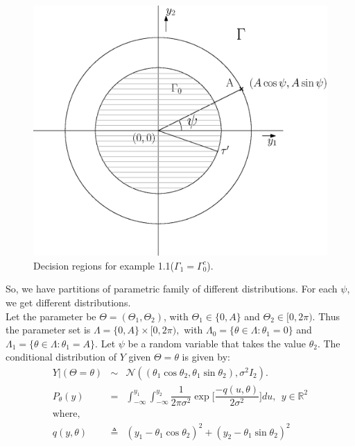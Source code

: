 \documentclass[a4paper,english,12pt]{article}
\begin{document}
\begin{exmp}
\begin{figure}
\centering
\includegraphics[scale=0.4]{Figures/decisionRegions.eps}
\caption{Decision regions for example 1.1($\Gamma_1 = \Gamma_0^c$).}
\label{fig: example 1.1}
\end{figure}
	
So, we have partitions of parametric family of different distributions.
For each $\psi$, we get different distributions.\\
Let the parameter be $\Theta = (\Theta_1,\Theta_2)$, with $\Theta_1 \in \{0,A\}$ and $\Theta_2 \in [0,2\pi)$. Thus the parameter set is $\Lambda = \{0,A\}\times [0,2\pi),$ with $\Lambda_0 = \{\theta \in \Lambda : \theta_1 = 0\}$ and $\Lambda_1 = \{\theta \in \Lambda : \theta_1 = A\}$. Let $\psi$ be a random variable that takes the value $\theta_2$. The conditional distribution of $Y$ given $\Theta = \theta$ is given by:\\
	
\begin{eqnarray}
Y|(\Theta=\theta) &\sim& \mathcal{N} ((\theta_1\cos\theta_2,\theta_1\sin\theta_2), \sigma^2I_2).\\
P_\theta(y) &=& \int_{-\infty}^{y_1}\int_{-\infty}^{y_2}\dfrac{1}{2\pi\sigma^2}\exp\Big[\dfrac{-q(u,\theta)}{2\sigma^2}\Big]du, ~~ y \in {\mathbb{R}}^2\\
\mbox{where,}\nonumber\\
q(y,\theta) &\triangleq& (y_1-\theta_1\cos\theta_2)^2 + (y_2-\theta_1\sin\theta_2)^2
\end{eqnarray}
	

\end{exmp}
\end{document}
